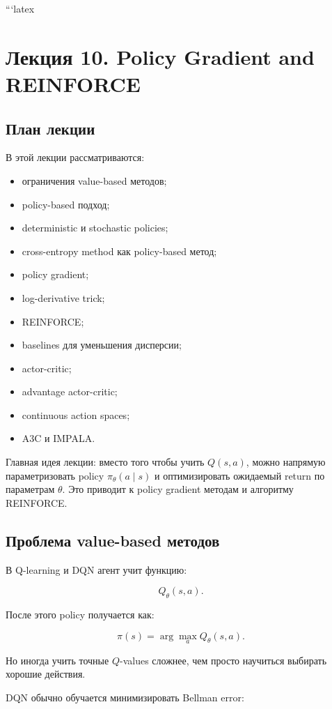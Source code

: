 \documentclass[a4paper,12pt]{article}
\begin{document}
```latex
\section{Лекция 10. Policy Gradient and REINFORCE}

\subsection{План лекции}

В этой лекции рассматриваются:

\begin{itemize}
    \item ограничения value-based методов;
    \item policy-based подход;
    \item deterministic и stochastic policies;
    \item cross-entropy method как policy-based метод;
    \item policy gradient;
    \item log-derivative trick;
    \item REINFORCE;
    \item baselines для уменьшения дисперсии;
    \item actor-critic;
    \item advantage actor-critic;
    \item continuous action spaces;
    \item A3C и IMPALA.
\end{itemize}

Главная идея лекции: вместо того чтобы учить \(Q(s,a)\), можно напрямую параметризовать policy \(\pi_\theta(a \mid s)\) и оптимизировать ожидаемый return по параметрам \(\theta\). Это приводит к policy gradient методам и алгоритму REINFORCE.

\subsection{Проблема value-based методов}

В Q-learning и DQN агент учит функцию:

\[
Q_\theta(s,a).
\]

После этого policy получается как:

\[
\pi(s)
=
\arg\max_a Q_\theta(s,a).
\]

Но иногда учить точные \(Q\)-values сложнее, чем просто научиться выбирать хорошие действия.

DQN обычно обучается минимизировать Bellman error:
\end{document}
